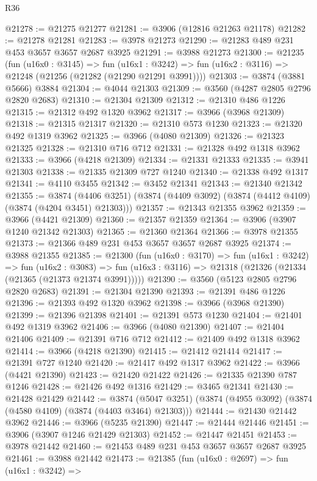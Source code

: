 \begin{lexlean}{R36}
\begin{coremodule}
@21278 := @21275 @21277
@21281 := @3906 (@12816 @21263 @21178)
@21282 := @21278 @21281
@21283 := @3978 @21273
@21290 := @21283 @489 @231 @453 @3657 @3657 @2687 @3925
@21291 := @3988 @21273
@21300 := @21235
    (fun (u16x0 : @3145) =>
    fun (u16x1 : @3242) => fun (u16x2 : @3116) => @21248 (@21256 (@21282 (@21290 @21291 @3991))))
@21303 := @3874 (@3881 @5666) @3884
@21304 := @4044 @21303
@21309 := @3560 (@4287 @2805 @2796 @2820 @2683)
@21310 := @21304 @21309
@21312 := @21310 @486 @1226
@21315 := @21312 @492 @1320 @3962
@21317 := @3966 (@3968 @21309)
@21318 := @21315 @21317
@21320 := @21310 @573 @1230
@21323 := @21320 @492 @1319 @3962
@21325 := @3966 (@4080 @21309)
@21326 := @21323 @21325
@21328 := @21310 @716 @712
@21331 := @21328 @492 @1318 @3962
@21333 := @3966 (@4218 @21309)
@21334 := @21331 @21333
@21335 := @3941 @21303
@21338 := @21335 @21309 @727 @1240
@21340 := @21338 @492 @1317
@21341 := @4110 @3455
@21342 := @3452 @21341
@21343 := @21340 @21342
@21355 := @3874
    (@4406 @3251)
    (@3874 (@4409 @3092) (@3874 (@4412 @4109) (@3874 (@4204 @3451) @21303)))
@21357 := @21343 @21355 @3962
@21359 := @3966 (@4421 @21309)
@21360 := @21357 @21359
@21364 := @3906 (@3907 @1240 @21342 @21303)
@21365 := @21360 @21364
@21366 := @3978 @21355
@21373 := @21366 @489 @231 @453 @3657 @3657 @2687 @3925
@21374 := @3988 @21355
@21385 := @21300
    (fun (u16x0 : @3170) =>
    fun (u16x1 : @3242) =>
    fun (u16x2 : @3083) =>
    fun (u16x3 : @3116) => @21318 (@21326 (@21334 (@21365 (@21373 @21374 @3991)))))
@21390 := @3560 (@5123 @2805 @2796 @2820 @2683)
@21391 := @21304 @21390
@21393 := @21391 @486 @1226
@21396 := @21393 @492 @1320 @3962
@21398 := @3966 (@3968 @21390)
@21399 := @21396 @21398
@21401 := @21391 @573 @1230
@21404 := @21401 @492 @1319 @3962
@21406 := @3966 (@4080 @21390)
@21407 := @21404 @21406
@21409 := @21391 @716 @712
@21412 := @21409 @492 @1318 @3962
@21414 := @3966 (@4218 @21390)
@21415 := @21412 @21414
@21417 := @21391 @727 @1240
@21420 := @21417 @492 @1317 @3962
@21422 := @3966 (@4421 @21390)
@21423 := @21420 @21422
@21426 := @21335 @21390 @787 @1246
@21428 := @21426 @492 @1316
@21429 := @3465 @21341
@21430 := @21428 @21429
@21442 := @3874
    (@5047 @3251)
    (@3874 (@4955 @3092) (@3874 (@4580 @4109) (@3874 (@4403 @3464) @21303)))
@21444 := @21430 @21442 @3962
@21446 := @3966 (@5235 @21390)
@21447 := @21444 @21446
@21451 := @3906 (@3907 @1246 @21429 @21303)
@21452 := @21447 @21451
@21453 := @3978 @21442
@21460 := @21453 @489 @231 @453 @3657 @3657 @2687 @3925
@21461 := @3988 @21442
@21473 := @21385
    (fun (u16x0 : @2697) =>
    fun (u16x1 : @3242) =>

\end{coremodule}
\end{lexlean}
